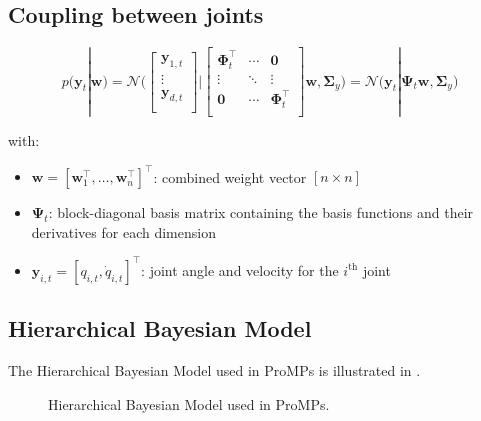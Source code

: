 \documentclass{article}
\begin{document}
\subsection{Coupling between joints}

\begin{equation}
p(\bm{y}_t|\bm{w}) = \mathcal{N}\Bigg(
        \begin{bmatrix}
                \bm{y}_{1,t} \\
                \vdots\\
                \bm{y}_{d,t} \\
        \end{bmatrix}
        \Bigg|
        \begin{bmatrix}
                \bm{\Phi}^{\top}_{t} & \cdots & \bm{0} \\
                \vdots &\ddots & \vdots\\
                \bm{0} & \cdots & \bm{\Phi}^{\top}_{t} \\
        \end{bmatrix}
        \bm{w}, \bm{\Sigma}_y
\Bigg) = \mathcal{N}\Big(\bm{y}_t|\bm{\Psi}_t\bm{w},\bm{\Sigma}_y \Big)
\end{equation}

with:
\begin{itemize}
    \item $\bm{w}=[\bm{w}^\top_1, \dots, \bm{w}^\top_n]^\top$: combined weight vector $[n \times n]$
    \item $\bm{\Psi}_t$: block-diagonal basis matrix containing the basis functions and their derivatives for each dimension
    \item $\bm{y}_{i,t} = [q_{i,t}, \dot{q}_{i,t}]^\top$: joint angle and velocity for the $i^{\text{th}}$ joint
\end{itemize}

\subsection{Hierarchical Bayesian Model}

The Hierarchical Bayesian Model used in ProMPs is illustrated in .

\begin{figure}[htbp]
\centering
{}
\caption{Hierarchical Bayesian Model used in ProMPs.}
\label{fig:HBM}
\end{figure}
\end{document}
